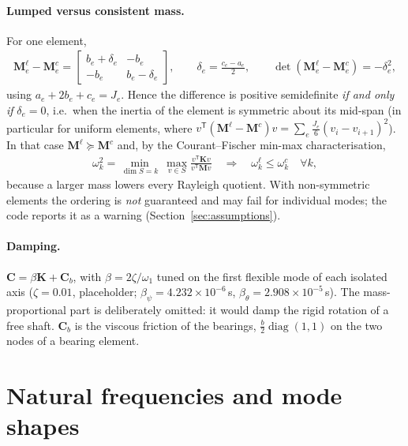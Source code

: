 \documentclass[10pt,a4paper]{article}
\numberwithin{equation}{section}
\begin{document}
\paragraph{Lumped versus consistent mass.} For one element,
\begin{gather}
\mathbf M_e^{\ell} - \mathbf M_e^{c} = \begin{bmatrix} b_e + \delta_e & -b_e \\ -b_e & b_e - \delta_e\end{bmatrix}, \qquad \delta_e = \frac{c_e - a_e}{2}, \qquad
\det\left(\mathbf M_e^{\ell} - \mathbf M_e^{c}\right) = -\delta_e^2 ,
\end{gather}
using $a_e + 2b_e + c_e = J_e$. Hence the difference is positive semidefinite \emph{if and only if} $\delta_e = 0$, i.e.\ when the inertia of the element is symmetric about its mid-span (in particular for uniform elements, where $v^{\mathsf T}(\mathbf M^{\ell}-\mathbf M^{c})v = \sum_e \frac{J_e}{6}(v_i - v_{i+1})^2$). In that case $\mathbf M^{\ell}\succeq\mathbf M^{c}$ and, by the Courant--Fischer min-max characterisation,
\begin{gather}
\omega_k^2 = \min_{\dim S = k}\ \max_{v\in S}\frac{v^{\mathsf T}\mathbf K v}{v^{\mathsf T}\mathbf M v}\quad\Longrightarrow\quad \omega_k^{\ell} \le \omega_k^{c}\quad\forall k,
\end{gather}
because a larger mass lowers every Rayleigh quotient. With non-symmetric elements the ordering is \emph{not} guaranteed and may fail for individual modes; the code reports it as a warning (Section~\ref{sec:assumptions}).
\paragraph{Damping.} $\mathbf C = \beta\mathbf K + \mathbf C_b$, with $\beta = 2\zeta/\omega_1$ tuned on the first flexible mode of each isolated axis ($\zeta = 0.01$, placeholder; $\beta_\psi = 4.232\times10^{-6}$\,s, $\beta_\theta = 2.908\times10^{-5}$\,s). The mass-proportional part is deliberately omitted: it would damp the rigid rotation of a free shaft. $\mathbf C_b$ is the viscous friction of the bearings, $\frac{b}{2}\operatorname{diag}(1,1)$ on the two nodes of a bearing element.
\section{Natural frequencies and mode shapes}\label{sec:eigen}
\end{document}
